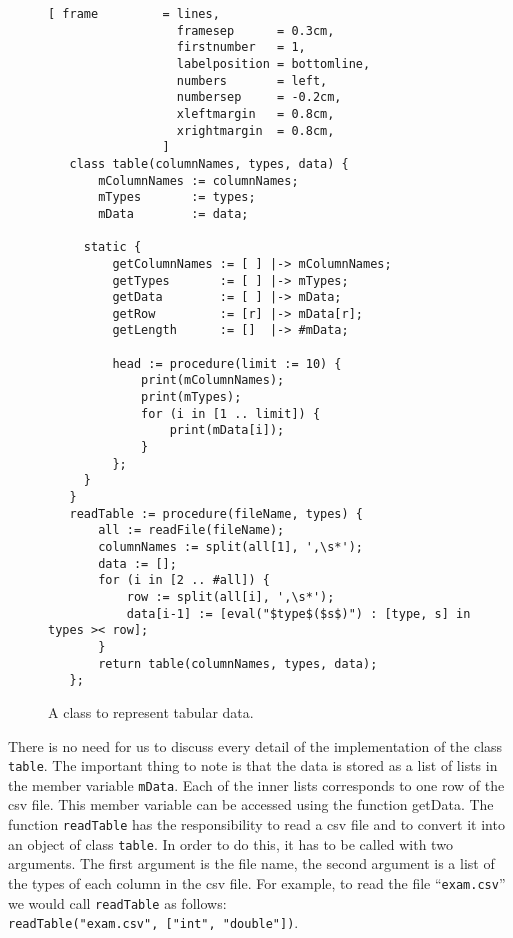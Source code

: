 \begin{figure}[!ht]
\centering
\begin{Verbatim}[ frame         = lines, 
                  framesep      = 0.3cm, 
                  firstnumber   = 1,
                  labelposition = bottomline,
                  numbers       = left,
                  numbersep     = -0.2cm,
                  xleftmargin   = 0.8cm,
                  xrightmargin  = 0.8cm,
                ]
   class table(columnNames, types, data) {
       mColumnNames := columnNames;
       mTypes       := types;
       mData        := data;
   
     static {
         getColumnNames := [ ] |-> mColumnNames;
         getTypes       := [ ] |-> mTypes;
         getData        := [ ] |-> mData;
         getRow         := [r] |-> mData[r];
         getLength      := []  |-> #mData;
         
         head := procedure(limit := 10) {
             print(mColumnNames);
             print(mTypes);
             for (i in [1 .. limit]) {
                 print(mData[i]);
             }
         };
     }
   }
   readTable := procedure(fileName, types) {
       all := readFile(fileName);
       columnNames := split(all[1], ',\s*');
       data := [];
       for (i in [2 .. #all]) {
           row := split(all[i], ',\s*');
           data[i-1] := [eval("$type$($s$)") : [type, s] in types >< row];
       }
       return table(columnNames, types, data);
   };
\end{Verbatim}
\vspace*{-0.3cm}
\caption{A class to represent tabular data.}
\label{fig:table.stlx}
\end{figure}
There is no need for us to discuss every detail of the implementation of the class \texttt{table}.
The important thing to note is that the data is stored as a list of lists in the member variable
\texttt{mData}.  Each of the inner lists corresponds to one row of the csv file.
This member variable can be accessed using the function getData.  The function \texttt{readTable}
has the responsibility to read a csv file and to convert it into an object of class \texttt{table}.
In order to do this, it has to be called with two arguments.  The first argument is the file name,
the second argument is a list of the types of each column in the csv file.  For example, to read the
file ``\texttt{exam.csv}'' we would call \texttt{readTable} as follows:
\\[0.2cm]
\hspace*{1.3cm}
\texttt{readTable("exam.csv", ["int", "double"])}.



